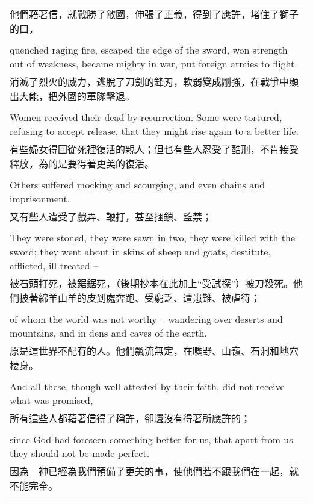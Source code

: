 \documentclass{book}
\begin{document}
\begin{tabularx}{\textwidth}{p{}}
他們藉著信，就戰勝了敵國，伸張了正義，得到了應許，堵住了獅子的口， \\ \\
quenched raging fire, escaped the edge of the sword, won strength out of weakness, became mighty in war, put foreign armies to flight. \\
消滅了烈火的威力，逃脫了刀劍的鋒刃，軟弱變成剛強，在戰爭中顯出大能，把外國的軍隊擊退。 \\ \\
Women received their dead by resurrection. Some were tortured, refusing to accept release, that they might rise again to a better life. \\
有些婦女得回從死裡復活的親人；但也有些人忍受了酷刑，不肯接受釋放，為的是要得著更美的復活。 \\ \\
Others suffered mocking and scourging, and even chains and imprisonment. \\
又有些人遭受了戲弄、鞭打，甚至捆鎖、監禁； \\ \\
They were stoned, they were sawn in two, they were killed with the sword; they went about in skins of sheep and goats, destitute, afflicted, ill-treated -- \\
被石頭打死，被鋸鋸死，（後期抄本在此加上“受試探”）被刀殺死。他們披著綿羊山羊的皮到處奔跑、受窮乏、遭患難、被虐待； \\ \\
of whom the world was not worthy -- wandering over deserts and mountains, and in dens and caves of the earth. \\
原是這世界不配有的人。他們飄流無定，在曠野、山嶺、石洞和地穴棲身。 \\ \\
And all these, though well attested by their faith, did not receive what was promised, \\
所有這些人都藉著信得了稱許，卻還沒有得著所應許的； \\ \\
since God had foreseen something better for us, that apart from us they should not be made perfect. \\
因為　神已經為我們預備了更美的事，使他們若不跟我們在一起，就不能完全。 \\ \\

\hline
\end{tabularx}

\newpage
\end{document}
